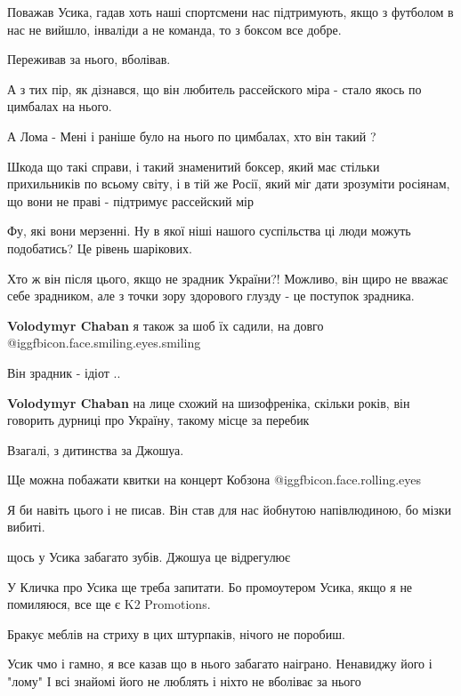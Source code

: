 \begin{itemize}

Поважав Усика, гадав хоть наші спортсмени нас підтримують, якщо з футболом в
нас не вийшло, інваліди а не команда, то з боксом все добре.

Переживав за нього, вболівав.

А з тих пір, як дізнався, що він любитель рассейского міра - стало якось по
цимбалах на нього.

А Лома - Мені і раніше було на нього по цимбалах, хто він такий ?

Шкода що такі справи, і такий знаменитий боксер, який має стільки прихильників
по всьому світу, і в тій же Росії, який міг дати зрозуміти росіянам, що вони не
праві - підтримує рассейский мір


Фу, які вони мерзенні. Ну в якої ніші нашого суспільства ці люди можуть
подобатись? Це рівень шарікових.



Хто ж він після цього, якщо не зрадник України?! Можливо, він щиро не вважає
себе зрадником, але з точки зору здорового глузду - це поступок зрадника.

\begin{itemize} %
\textbf{Volodymyr Chaban} я також за шоб їх садили, на довго @igg{fbicon.face.smiling.eyes.smiling} 

Він зрадник - ідіот ..

\textbf{Volodymyr Chaban} на лице схожий на шизофреніка, скільки років, він говорить дурниці про Україну, такому місце за перебик
\end{itemize} %

Взагалі, з дитинства за Джошуа.

Ще можна побажати квитки на концерт Кобзона @igg{fbicon.face.rolling.eyes} 

Я би навіть цього і не писав. Він став для нас йобнутою напівлюдиною, бо мізки вибиті.

щось у Усика забагато зубів. Джошуа це відрегулює

У Кличка про Усика ще треба запитати. Бо промоутером Усика, якщо я не помиляюся, все ще є K2 Promotions.

Бракує меблів на стриху в цих штурпаків, нічого не поробиш.

Усик чмо і гамно, я все казав що в нього забагато наіграно. Ненавиджу його і "лому"
І всі знайомі його не люблять і ніхто не вболіває за нього


\end{itemize} %
